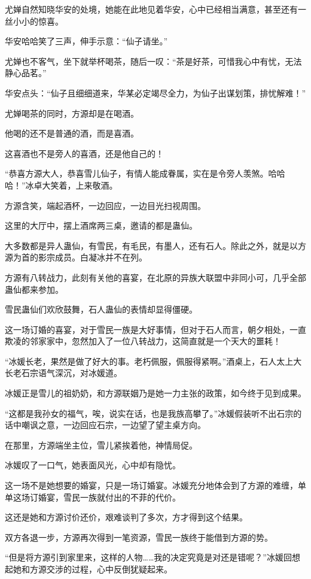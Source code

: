 \begin{this_body}
尤婵自然知晓华安的处境，她能在此地见着华安，心中已经相当满意，甚至还有一丝小小的惊喜。

华安哈哈笑了三声，伸手示意：“仙子请坐。”

尤婵也不客气，坐下就举杯喝茶，随后一叹：“茶是好茶，可惜我心中有忧，无法静心品茗。”

华安点头：“仙子且细细道来，华某必定竭尽全力，为仙子出谋划策，排忧解难！”

尤婵喝茶的同时，方源却是在喝酒。

他喝的还不是普通的酒，而是喜酒。

这喜酒也不是旁人的喜酒，还是他自己的！

“恭喜方源大人，恭喜雪儿仙子，有情人能成眷属，实在是令旁人羡煞。哈哈哈！”冰卓大笑着，上来敬酒。

方源含笑，端起酒杯，一边回应，一边目光扫视周围。

这里的大厅中，摆上酒席两三桌，邀请的都是蛊仙。

大多数都是异人蛊仙，有雪民，有毛民，有墨人，还有石人。除此之外，就是以方源为首的影宗成员。白凝冰并不在列。

方源有八转战力，此刻有关他的喜宴，在北原的异族大联盟中非同小可，几乎全部蛊仙都来参加。

雪民蛊仙们欢欣鼓舞，石人蛊仙的表情却显得僵硬。

这一场订婚的喜宴，对于雪民一族是大好事情，但对于石人而言，朝夕相处，一直欺凌的邻家家中，忽然加入了一位八转战力，这简直就是一个天大的噩耗！

“冰媛长老，果然是做了好大的事。老朽佩服，佩服得紧啊。”酒桌上，石人太上大长老石宗语气深沉，对冰媛道。

冰媛正是雪儿的祖奶奶，和方源联姻乃是她一力主张的政策，如今终于见到成果。

“这都是我孙女的福气，唉，说实在话，也是我族高攀了。”冰媛假装听不出石宗的话中嘲讽之意，一边回应石宗，一边望了望主桌方向。

在那里，方源端坐主位，雪儿紧挨着他，神情局促。

冰媛叹了一口气，她表面风光，心中却有隐忧。

这一场不是她想要的婚宴，只是一场订婚宴。冰媛充分地体会到了方源的难缠，单单这场订婚宴，雪民一族就付出的不菲的代价。

这还是她和方源讨价还价，艰难谈判了多次，方才得到这个结果。

双方各退一步，方源再次得到一笔资源，雪民一族终于能借到方源的势。

“但是将方源引到家里来，这样的人物……我的决定究竟是对还是错呢？”冰媛回想起她和方源交涉的过程，心中反倒犹疑起来。


\end{this_body}
